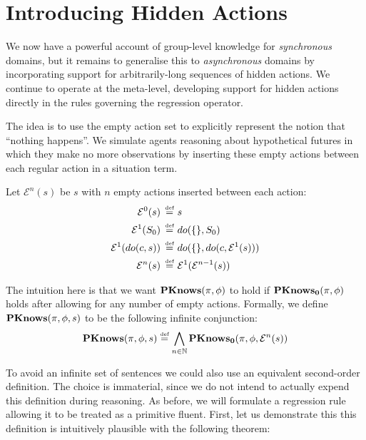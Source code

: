\section{Introducing Hidden Actions\label{sec:CKnowledge:Asynchronous}}

We now have a powerful account of group-level knowledge for \emph{synchronous}
domains, but it remains to generalise this to \emph{asynchronous}
domains by incorporating support for arbitrarily-long sequences of
hidden actions. We continue to operate at the meta-level, developing
support for hidden actions directly in the rules governing the regression
operator.

The idea is to use the empty action set to explicitly represent the
notion that {}``nothing happens''. We simulate agents reasoning
about hypothetical futures in which they make no more observations
by inserting these empty actions between each regular action in a
situation term.

\begin{defn}
Let $\mathcal{E}^{n}(s)$ be $s$ with $n$ empty actions inserted
between each action:\begin{align*}
\mathcal{E}^{0}(s)\,\stackrel{\mbox{\tiny def}}{=}\,\, & s\\
\mathcal{E}^{1}(S_{0})\,\stackrel{\mbox{\tiny def}}{=}\,\, & do(\{\},S_{0})\\
\mathcal{E}^{1}(do(c,s))\,\stackrel{\mbox{\tiny def}}{=}\,\, & do(\{\},do(c,\mathcal{E}^{1}(s)))\\
\mathcal{E}^{n}(s)\,\stackrel{\mbox{\tiny def}}{=}\,\, & \mathcal{E}^{1}(\mathcal{E}^{n-1}(s))\end{align*}

\end{defn}
The intuition here is that we want $\mathbf{PKnows}(\pi,\phi)$ to hold if
$\mathbf{PKnows_{0}}(\pi,\phi)$ holds after allowing for any number of empty
actions. Formally, we define $\mathbf{PKnows}(\pi,\phi,s)$ to be the following
infinite conjunction:\[
\mathbf{PKnows}(\pi,\phi,s)\stackrel{\mbox{\tiny def}}{=}\bigwedge_{n\in\mathbb{N}}\mathbf{PKnows_{0}}(\pi,\phi,\mathcal{E}^{n}(s))\]


To avoid an infinite set of sentences we could also use an equivalent
second-order definition. The choice is immaterial, since we do not
intend to actually expend this definition during reasoning. As before,
we will formulate a regression rule allowing it to be treated as a
primitive fluent. First, let us demonstrate this this definition is
intuitively plausible with the following theorem:

